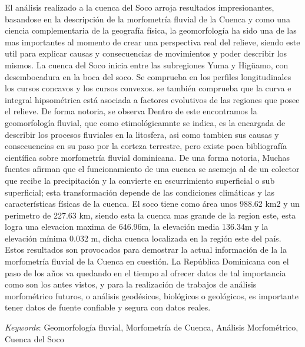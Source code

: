 \documentclass[11pt,]{article}
\renewenvironment{abstract}
 {{%
    \setlength{\leftmargin}{0mm}
    \setlength{\rightmargin}{\leftmargin}%
  }%
  \relax}
 {\endlist}
\begin{document}
\begin{abstract}

    \hbox{\vrule height .2pt width 39.14pc}

    \vskip 8.5pt %

\noindent El análisis realizado a la cuenca del Soco arroja resultados
impresionantes, basandose en la descripción de la morfometría fluvial de
la Cuenca y como una ciencia complementaria de la geografía física, la
geomorfología ha sido una de las mas importantes al momento de crear una
perspectiva real del relieve, siendo este util para explicar causas y
consecuencias de movimientos y poder describir los mismos. La cuenca del
Soco inicia entre las subregiones Yuma y Higüamo, con desembocadura en
la boca del soco. Se comprueba en los perfiles longitudinales los cursos
concavos y los cursos convexos. se también comprueba que la curva e
integral hipsométrica está asociada a factores evolutivos de las
regiones que posee el relieve. De forma notoria, se observa Dentro de
este encontramos la geomorfología fluvial, que como etimológicamnte se
indica, es la encargada de describir los procesos fluviales en la
litosfera, asi como tambien sus causas y consecuencias en su paso por la
corteza terrestre, pero existe poca bibliografía científica sobre
morfometría fluvial dominicana. De una forma notoria, Muchas fuentes
afirman que el funcionamiento de una cuenca se asemeja al de un colector
que recibe la precipitación y la convierte en escurrimiento superficial
o sub superficial; esta transformación depende de las condiciones
climáticas y las características físicas de la cuenca. El soco tiene
como área unos 988.62 km2 y un perimetro de 227.63 km, siendo esta la
cuenca mas grande de la region este, esta logra una elevacion maxima de
646.96m, la elevación media 136.34m y la elevación mínima 0.032 m, dicha
cuenca localizada en la región este del país. Estos resultados son
provocados para demostrar la actual información de la la morfometría
fluvial de la Cuenca en cuestión. La República Dominicana con el paso de
los años va quedando en el tiempo al ofrecer datos de tal importancia
como son los antes vistos, y para la realización de trabajos de análisis
morfométrico futuros, o análisis geodésicos, biológicos o geológicos, es
importante tener datos de fuente confiable y segura con datos reales.


\vskip 8.5pt \noindent \emph{Keywords}: Geomorfología fluvial, Morfometría de Cuenca, Análisis Morfométrico,
Cuenca del Soco \par

    \hbox{\vrule height .2pt width 39.14pc}



\end{abstract}
\end{document}
